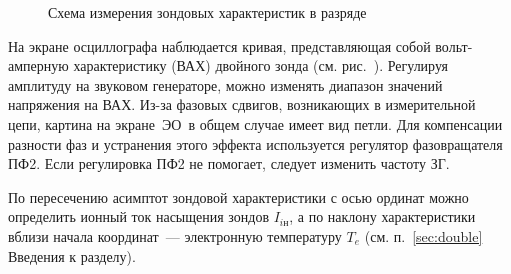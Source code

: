 \begin{figure}[h!]
    \centering
    \caption{Схема измерения зондовых характеристик в разряде}
\end{figure}

На экране осциллографа наблюдается кривая, представляющая собой вольт-амперную
характеристику (ВАХ) двойного зонда (см. рис.~).
Регулируя амплитуду на звуковом генераторе, можно изменять диапазон значений
напряжения  на ВАХ. Из-за фазовых сдвигов, возникающих в измерительной цепи, 
картина на экране~ЭО~в общем случае имеет вид петли.
Для компенсации разности фаз и устранения этого эффекта 
используется регулятор фазовращателя ПФ2. Если регулировка ПФ2 не помогает,
следует изменить частоту ЗГ.

По пересечению асимптот зондовой характеристики с осью ординат
можно определить ионный ток насыщения зондов $I_{iн}$, а по наклону 
характеристики вблизи начала координат~--- электронную температуру $T_e$
(см. п.~\ref{sec:double} Введения к разделу).




